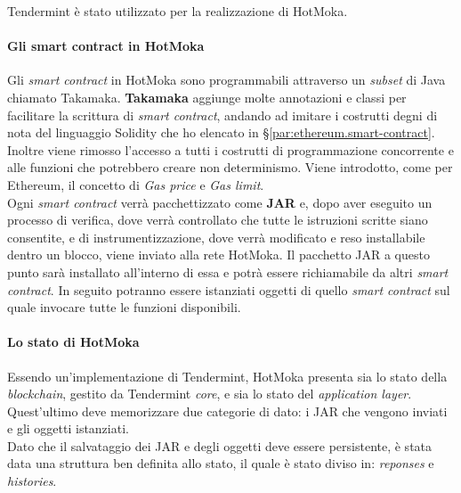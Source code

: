 \noindent Tendermint è stato utilizzato per la realizzazione di HotMoka.

\paragraph{Gli smart contract in HotMoka}
Gli \textit{smart contract} in HotMoka sono programmabili attraverso un \textit{subset} di Java chiamato Takamaka. \textbf{Takamaka} aggiunge molte annotazioni e classi per facilitare la scrittura di \textit{smart contract}, andando ad imitare i costrutti degni di nota del linguaggio Solidity che ho elencato in §\ref{par:ethereum.smart-contract}. Inoltre viene rimosso l'accesso a tutti i costrutti di programmazione concorrente e alle funzioni che potrebbero creare non determinismo. Viene introdotto, come per Ethereum, il concetto di \textit{Gas price} e \textit{Gas limit}. \\

Ogni \textit{smart contract} verrà pacchettizzato come \textbf{JAR} e, dopo aver eseguito un processo di verifica, dove verrà controllato che tutte le istruzioni scritte siano consentite, e di instrumentizzazione, dove verrà modificato e reso installabile dentro un blocco, viene inviato alla rete HotMoka.  
Il pacchetto JAR a questo punto sarà installato all'interno di essa e potrà essere richiamabile da altri \textit{smart contract}.
In seguito potranno essere istanziati oggetti di quello \textit{smart contract} sul quale invocare tutte le funzioni disponibili.


\paragraph{Lo stato di HotMoka}
Essendo un'implementazione di Tendermint, HotMoka presenta sia lo stato della \textit{blockchain}, gestito da Tendermint \textit{core}, e sia lo stato del \textit{application layer}. Quest'ultimo deve memorizzare due categorie di dato: i JAR che vengono inviati e gli oggetti istanziati. \\

Dato che il salvataggio dei JAR e degli oggetti deve essere persistente, è stata data una struttura ben definita allo stato, il quale è stato diviso in: \textit{reponses} e \textit{histories}.

